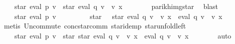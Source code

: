 \begin{isabellebody}
\ {\isachardoublequoteopen}{\isasymdots}\ {\isacharequal}{\kern0pt}\ {\isasymPsi}\ {\isacharparenleft}{\kern0pt}star\ {\isacharparenleft}{\kern0pt}eval\ p\ v{\isacharparenright}{\kern0pt}\ {\isacharat}{\kern0pt}{\isacharat}{\kern0pt}\ star\ {\isacharparenleft}{\kern0pt}eval\ q\ v\ {\isacharat}{\kern0pt}{\isacharat}{\kern0pt}\ v\ x{\isacharparenright}{\kern0pt}{\isacharparenright}{\kern0pt}{\isachardoublequoteclose}\isanewline
\ \ \ \ \ \ \isamarkupfalse%
\ parikh{\isacharunderscore}{\kern0pt}img{\isacharunderscore}{\kern0pt}star\ \isamarkupfalse%
\ blast\isanewline
\ \ \ \ \isamarkupfalse%
\ \isamarkupfalse%
\ {\isachardoublequoteopen}{\isasymdots}\ {\isacharequal}{\kern0pt}\ {\isasymPsi}\ {\isacharparenleft}{\kern0pt}star\ {\isacharparenleft}{\kern0pt}eval\ p\ v{\isacharparenright}{\kern0pt}\ {\isacharat}{\kern0pt}{\isacharat}{\kern0pt}\isanewline
\ \ \ \ \ \ \ \ star\ {\isacharparenleft}{\kern0pt}{\isacharbraceleft}{\kern0pt}{\isacharbrackleft}{\kern0pt}{\isacharbrackright}{\kern0pt}{\isacharbraceright}{\kern0pt}\ {\isasymunion}\ star\ {\isacharparenleft}{\kern0pt}eval\ q\ v\ {\isacharat}{\kern0pt}{\isacharat}{\kern0pt}\ v\ x{\isacharparenright}{\kern0pt}\ {\isacharat}{\kern0pt}{\isacharat}{\kern0pt}\ eval\ q\ v\ {\isacharat}{\kern0pt}{\isacharat}{\kern0pt}\ v\ x{\isacharparenright}{\kern0pt}{\isacharparenright}{\kern0pt}{\isachardoublequoteclose}\isanewline
\ \ \ \ \ \ \isamarkupfalse%
\ {\isacharparenleft}{\kern0pt}metis\ Un{\isacharunderscore}{\kern0pt}commute\ conc{\isacharunderscore}{\kern0pt}star{\isacharunderscore}{\kern0pt}comm\ star{\isacharunderscore}{\kern0pt}idemp\ star{\isacharunderscore}{\kern0pt}unfold{\isacharunderscore}{\kern0pt}left{\isacharparenright}{\kern0pt}\isanewline
\ \ \ \ \isamarkupfalse%
\ \isamarkupfalse%
\ {\isachardoublequoteopen}{\isasymdots}\ {\isacharequal}{\kern0pt}\ {\isasymPsi}\ {\isacharparenleft}{\kern0pt}star\ {\isacharparenleft}{\kern0pt}eval\ p\ v{\isacharparenright}{\kern0pt}\ {\isacharat}{\kern0pt}{\isacharat}{\kern0pt}\ star\ {\isacharparenleft}{\kern0pt}star\ {\isacharparenleft}{\kern0pt}eval\ q\ v\ {\isacharat}{\kern0pt}{\isacharat}{\kern0pt}\ v\ x{\isacharparenright}{\kern0pt}\ {\isacharat}{\kern0pt}{\isacharat}{\kern0pt}\ eval\ q\ v\ {\isacharat}{\kern0pt}{\isacharat}{\kern0pt}\ v\ x{\isacharparenright}{\kern0pt}{\isacharparenright}{\kern0pt}{\isachardoublequoteclose}\isanewline
\ \ \ \ \ \ \isamarkupfalse%
\ auto\isanewline
\ \ \ \ \isamarkupfalse%

\end{isabellebody}
